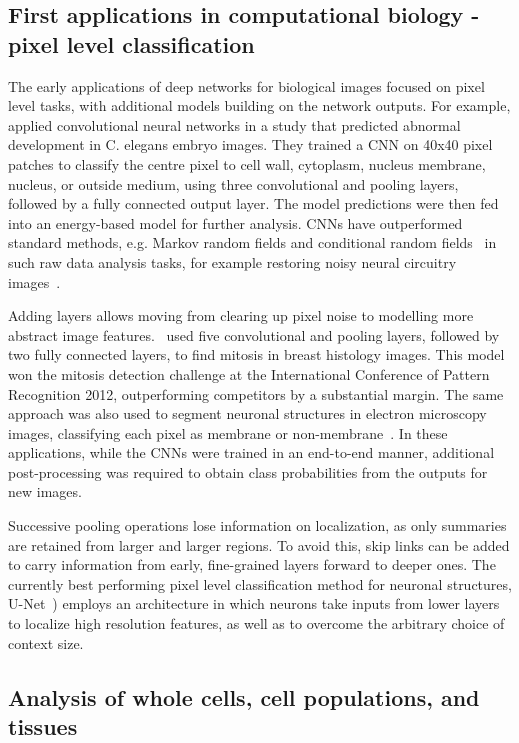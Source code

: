 \subsection{First applications in computational biology - pixel level classification}

The early applications of deep networks for biological images focused on pixel level tasks, with additional models building on the network outputs. For example, \citet{ning_toward_2005} applied convolutional neural networks in a study that predicted abnormal development in C. elegans embryo images. They trained a CNN on 40x40 pixel patches to classify the centre pixel to cell wall, cytoplasm, nucleus membrane, nucleus, or outside medium, using three convolutional and pooling layers, followed by a fully connected output layer. The model predictions were then fed into an energy-based model for further analysis. CNNs have outperformed standard methods, e.g. Markov random fields and conditional random fields~\citep{li_markov_2009} in such raw data analysis tasks, for example restoring noisy neural circuitry images~\citep{jain_supervised_2007}.

Adding layers allows moving from clearing up pixel noise to modelling more abstract image features.~\citet{ciresan_mitosis_2013} used five convolutional and pooling layers, followed by two fully connected layers, to find mitosis in breast histology images. This model won the mitosis detection challenge at the International Conference of Pattern Recognition 2012, outperforming competitors by a substantial margin. The same approach was also used to segment neuronal structures in electron microscopy images, classifying each pixel as membrane or non-membrane~\citep{ciresan_deep_2012}. In these applications, while the CNNs were trained in an end-to-end manner, additional post-processing was required to obtain class probabilities from the outputs for new images.

Successive pooling operations lose information on localization, as only summaries are retained from larger and larger regions. To avoid this, skip links can be added to carry information from early, fine-grained layers forward to deeper ones. The currently best performing pixel level classification method for neuronal structures, U-Net~\citep{ronneberger_u-net:_2015}) employs an architecture in which neurons take inputs from lower layers to localize high resolution features, as well as to overcome the arbitrary choice of context size.


\subsection{Analysis of whole cells, cell populations, and tissues}

